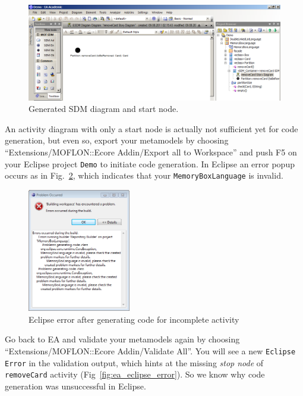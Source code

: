 \begin{figure}[htp]
\begin{center}
  \includegraphics[width=\textwidth]{pics/sdmBilder/removeCard/sdm02RAW}
  \caption{Generated SDM diagram and start node.}  
  \label{fig:sdm_skeleton}
\end{center}
\end{figure}

An activity diagram with only a start node is actually not sufficient 
yet for code generation, but even so, export your metamodels by choosing
``Extensions/MOFLON::Ecore Addin/Export all to Workspace'' and push F5 on your
Eclipse project \texttt{Demo} to initiate code generation.
In Eclipse an error popup occurs as in Fig.~\ref{fig:eclipse_error}, which
indicates that your \texttt{MemoryBoxLanguage} is invalid. 

\begin{figure}[htp]
\begin{center}
  \includegraphics[width=0.4\textwidth]{pics/sdmBilder/removeCard/sdm15RAW}
  \caption{Eclipse error after generating code for incomplete activity}  
  \label{fig:eclipse_error}
\end{center}
\end{figure}

Go back to EA and
validate your metamodels again by choosing ``Extensions/MOFLON::Ecore
Addin/Validate All''. You will see a new \texttt{Eclipse Error} in the
validation output, which hints at the missing \emph{stop node} of
\texttt{removeCard} activity (Fig~\ref{fig:ea_eclipse_error}). So we know why
code generation was unsuccessful in Eclipse.

